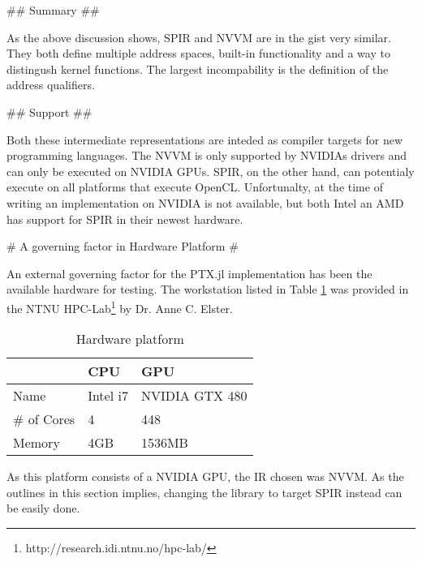 \begin{markdown}
## Summary ## 

As the above discussion shows, SPIR and NVVM are in the gist very
similar. They both define multiple address spaces, built-in
functionality and a way to distingush kernel functions. The largest
incompability is the definition of the address qualifiers. 

## Support ##

Both these intermediate representations are inteded as compiler
targets for new programming languages. The NVVM is only supported by
NVIDIAs drivers and can only be executed on NVIDIA GPUs. SPIR, on the
other hand, can potentialy execute on all platforms that execute
OpenCL. Unfortunalty, at the time of writing an implementation on
NVIDIA is not available, but both Intel an AMD has support for SPIR in
their newest hardware.

# A governing factor in Hardware Platform #

An external governing factor for the PTX.jl implementation has been the
available hardware for testing. The workstation listed in Table
\ref{tab:hw} was provided in the NTNU
HPC-Lab\footnote{http://research.idi.ntnu.no/hpc-lab/} by Dr. Anne
C. Elster.


\begin{table}[H]
  \centering
  \begin{tabular}{|l|l|l|}
    \hline
    & CPU & GPU \\
    \hline
    \hline
    Name & Intel i7 & NVIDIA GTX 480 \\
    \hline
    \# of Cores & 4 & 448 \\
    \hline
    Memory & 4GB & 1536MB \\
    \hline
  \end{tabular}
  \caption{Hardware platform}
  \label{tab:hw}
\end{table}

As this platform consists of a NVIDIA GPU, the IR chosen was NVVM. As
the outlines in this section implies, changing the library to target
SPIR instead can be easily done.

\end{markdown}
